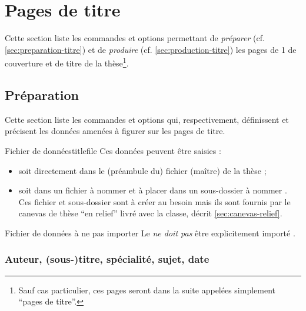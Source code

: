 \chapter{Pages de titre}\label{cha:pages-de-titre}

Cette section liste les commandes et options permettant de \emph{préparer} (cf.
\vref{sec:preparation-titre}) et de \emph{produire} (cf.
\vref{sec:production-titre}) les pages de 1\iere{} de couverture et de titre de
la thèse\footnote{Sauf cas particulier, ces pages seront dans la suite appelées
  simplement \enquote{pages de titre}.}.

\section{Préparation}\label{sec:preparation-titre}

Cette section liste les commandes et options qui, respectivement, définissent
et précisent les données amenées à figurer sur les pages de titre.

\begin{dbremark}{Fichier de données}{titlefile}
  Ces données peuvent être saisies :
  \begin{itemize}
  \item soit directement dans le (préambule du) fichier (maître) de
    la thèse ;
  \item soit dans un fichier à nommer \file{\titlefile} et à placer dans
    un sous-dossier à nommer \directory{\configurationdirectory}. Ces fichier
    et sous-dossier  sont à créer au
    besoin mais ils sont fournis par le canevas de thèse \enquote{en relief}
    livré avec la classe, décrit \vref{sec:canevas-relief}.
  \end{itemize}
\end{dbremark}

\begin{dbwarning}{Fichier de données à ne pas importer}{}
  Le \File{\titlefile} \emph{ne doit pas} être explicitement
  importé .
\end{dbwarning}

\subsection{Auteur, (sous-)titre, spécialité, sujet,
  date}\label{sec:caracteristiques}

